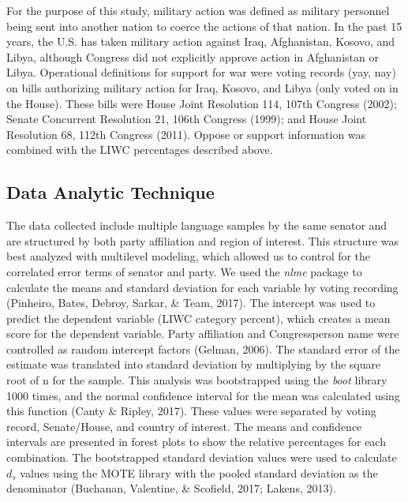\documentclass[english,man]{apa6}
\theoremstyle{definition}
\theoremstyle{definition}
\theoremstyle{definition}
\theoremstyle{remark}
\begin{document}
For the purpose of this study, military action was defined as military
personnel being sent into another nation to coerce the actions of that
nation. In the past 15 years, the U.S. has taken military action against
Iraq, Afghanistan, Kosovo, and Libya, although Congress did not
explicitly approve action in Afghanistan or Libya. Operational
definitions for support for war were voting records (yay, nay) on bills
authorizing military action for Iraq, Kosovo, and Libya (only voted on
in the House). These bills were House Joint Resolution 114, 107th
Congress (2002); Senate Concurrent Resolution 21, 106th Congress (1999);
and House Joint Resolution 68, 112th Congress (2011). Oppose or support
information was combined with the LIWC percentages described above.

\subsection{Data Analytic Technique}\label{data-analytic-technique}

The data collected include multiple language samples by the same senator
and are structured by both party affiliation and region of interest.
This structure was best analyzed with multilevel modeling, which allowed
us to control for the correlated error terms of senator and party. We
used the \emph{nlme} package to calculate the means and standard
deviation for each variable by voting recording (Pinheiro, Bates,
Debroy, Sarkar, \& Team, 2017). The intercept was used to predict the
dependent variable (LIWC category percent), which creates a mean score
for the dependent variable. Party affiliation and Congressperson name
were controlled as random intercept factors (Gelman, 2006). The standard
error of the estimate was translated into standard deviation by
multiplying by the square root of n for the sample. This analysis was
bootstrapped using the \emph{boot} library 1000 times, and the normal
confidence interval for the mean was calculated using this function
(Canty \& Ripley, 2017). These values were separated by voting record,
Senate/House, and country of interest. The means and confidence
intervals are presented in forest plots to show the relative percentages
for each combination. The bootstrapped standard deviation values were
used to calculate \(d_s\) values using the MOTE library with the pooled
standard deviation as the denominator (Buchanan, Valentine, \& Scofield,
2017; Lakens, 2013).
\end{document}
